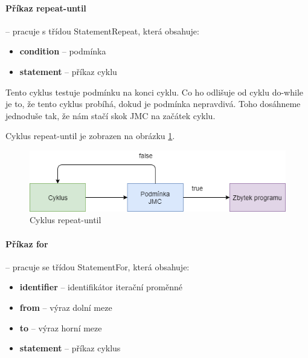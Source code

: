 \documentclass[
12pt,
a4paper,
pdftex,
czech,
titlepage
]{report}
\begin{document}
\paragraph{Příkaz repeat-until} --  pracuje s třídou StatementRepeat, která obsahuje:
\begin{itemize}
\item \textbf{condition} -- podmínka
\item \textbf{statement} -- příkaz cyklu
\end{itemize}

Tento cyklus testuje podmínku na konci cyklu. Co ho odlišuje od cyklu do-while je to, že tento cyklus probíhá, dokud je podmínka nepravdivá. Toho dosáhneme jednoduše tak, že nám stačí skok JMC na začátek cyklu.

Cyklus repeat-until je zobrazen na obrázku \ref{repeatUntil}.

\begin{figure}[H]
\caption{Cyklus repeat-until}
\label{repeatUntil}
\includegraphics[width=\textwidth]{repeatUntil.png}
\end{figure}

\paragraph{Příkaz for} -- pracuje se třídou StatementFor, která obsahuje:
\begin{itemize}
\item \textbf{identifier} -- identifikátor iterační proměnné
\item \textbf{from} -- výraz dolní meze
\item \textbf{to} -- výraz horní meze
\item \textbf{statement} -- příkaz cyklus
\end{itemize}
\end{document}
